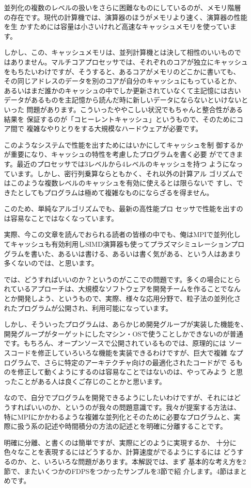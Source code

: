 並列化の複数のレベルの扱いをさらに困難なものにしているのが、メモリ階層
の存在です。現代の計算機では、演算器のほうがメモリより速く、演算器の性能を生
かすためには容量は小さいけれど高速なキャッシュメモリを使っています。

しかし、この、キャッシュメモリは、並列計算機とは決して相性のいいもので
はありません。マルチコアプロセッサでは、それぞれのコアが独立にキャッシュ
をもちたいわけですが、そうすると、あるコアがメモリのどこかに書いても、
その同じアドレスのデータを別のコアが自分のキャッシュにもっているとか、
あるいはまだ誰かのキャッシュの中でしか更新されていなくて主記憶には古い
データがあるものを主記憶から読んだ時に新しいデータにならないといけないといった
問題があります。こういったややこしい状況でもちゃんと整合性がある結果を
保証するのが「コヒーレントキャッシュ」というもので、そのためにコア間で
複雑なやりとりをする大規模なハードウェアが必要です。

このようなシステムで性能を出すためにはいかにしてキャッシュを制
御するかが重要になり、キャッシュの特性を考慮したプログラムを書く必要
がでてきます。最近のプロセッサでは3レベルから4レベルのキャッシュを持つ
ようになっています。しかし、密行列乗算ならともかく、それ以外の計算アル
ゴリズムではこのような複数レベルのキャッシュを有効に使えるとは限らないで
すし、できたとしてもプログラムは極めて複雑なものにならざるを得ません。

このため、単純なアルゴリズムでも、最新の高性能プロ
セッサで性能を出すのは容易なことではなくなっています。

実際、今この文章を読んでおられる読者の皆様の中でも、俺はMPIで並列化し
てキャッシュも有効利用しSIMD演算器も使ってプラズマシミュレーションプロ
グラムを書いた、あるいは書ける、あるいは書く気がある、という人はあまり
多くないのでは、と思います。


では、どうすればいいのか？というのがここでの問題です。多くの場合にとら
れているアプローチは、大規模なソフトウェアを開発チームを作ることでなん
とか開発しよう、というもので、実際、様々な応用分野で、粒子法の並列化さ
れたプログラムが公開され、利用可能になっています。

しかし、そういったプログラムは、あらかじめ開発グループが実装した機能を、
開発グループがターゲットにしたマシン・OSで使うことしかできないのが普通
です。もちろん、オープンソースで公開されているものでは、原理的には
ソースコードを修正していろいろな機能を実装できるわけですが、巨大で複雑
なプログラムで、さらに特定のアーキテクチャ向けの最適化されたコードがで
るものを修正して動くようにするのは容易なことではないのは、やってみよう
と思ったことがある人は良くご存じのことかと思います。

なので、自分でプログラムを開発できるようにしたいわけですが、それにはど
うすればいいのか、というのが我々の問題意識です。我々が提案する方法は、
特にMPIにかかわるような複雑な並列化とそのために必要なプログラムと、実
際に扱う系の記述や時間積分の方法の記述とを明確に分離することです。

明確に分離、と書くのは簡単ですが、実際にどのように実現するか、
十分に色々なことを表現するにはどうするか、計算速度がでるようにするには
どうするのか、と、いろいろな問題があります。本解説では、まず
基本的な考え方を2節で、またいくつかのFDPSをつかったサンプルを3節で紹
介します。4節はまとめです。


